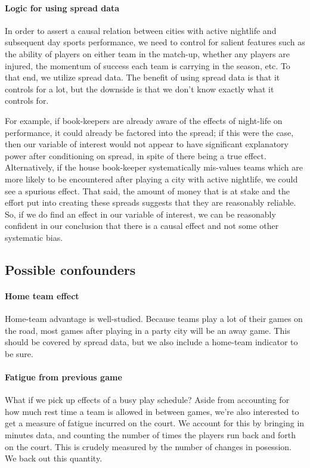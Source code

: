 \documentclass[letterpaper,12pt]{article}
\begin{document}
\paragraph{Logic for using spread data}
In order to assert a causal relation between cities with active nightlife 
and subsequent day sports performance, we need to control for salient
features such as the ability of players on either team in the match-up,
whether any players are injured, the momentum of success each team is carrying
in the season, etc. To that end, we utilize spread data.\cite{anderson} The benefit of
using spread data is that it controls for a lot, but the downside is that
we don't know exactly what it controls for.

For example, if book-keepers
are already aware of the effects of night-life on performance, it could
already be factored into the spread; if this were the case, then our variable
of interest would not appear to have significant explanatory power
after conditioning on spread, in spite of there being
a true effect. Alternatively,
if the house book-keeper systematically mis-values
teams which are more likely to be encountered after playing a city with active nightlife,
we could see a spurious effect. 
That said, the amount of money that is at stake and the effort put into creating these spreads 
suggests that they are reasonably reliable. 
So, if we do find an effect in our variable of interest,
we can be reasonably confident in our conclusion that there is a causal effect and not some 
other systematic bias.

\subsection{Possible confounders}

\paragraph{Home team effect}
Home-team advantage is well-studied.\cite{jones07, jones08}  
Because teams play a lot of their games on the road,
most games after playing in a party city will be an away game.
This should be covered by spread data, but we also include
a home-team indicator to be sure.

\paragraph{Fatigue from previous game}
What if we pick up effects of a busy play schedule?
Aside from accounting for how much rest time a team is allowed in between games,
we're also interested to get a measure of
fatigue incurred on the court.
We account for this by bringing in minutes data, and counting the number of 
times the players run back and forth on the court. This is crudely measured
by the number of changes in posession. We back out this quantity.
\end{document}
